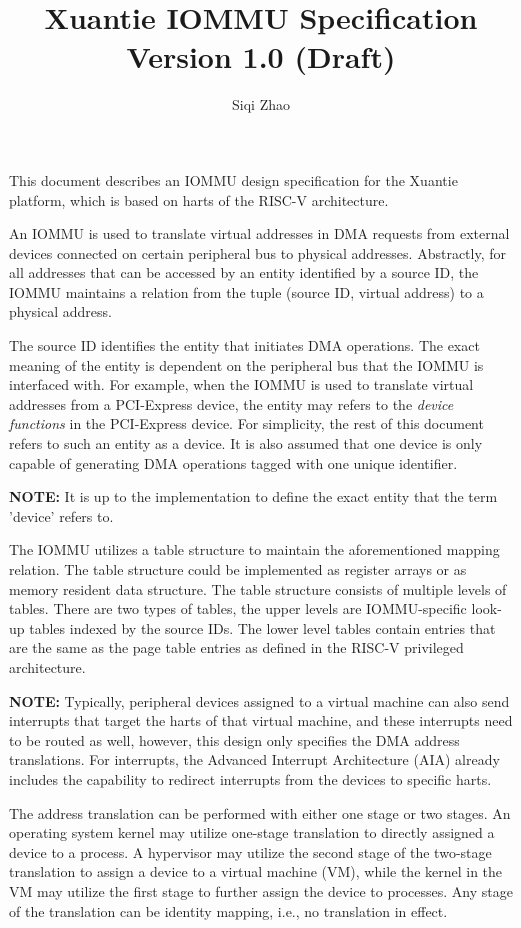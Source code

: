 \documentclass[12pt]{article}
\newcommand{\note}{\vspace{1em}\textbf{NOTE: }}
\newcommand{\noteend}{\vspace{1em}}
\begin{document}
\title{Xuantie IOMMU Specification Version 1.0 (Draft)}
\author{Siqi Zhao}
\maketitle


This document describes an IOMMU design specification for the Xuantie platform, which is
based on harts of the RISC-V architecture.

An IOMMU is used to translate virtual addresses in DMA requests from external devices
connected on certain peripheral bus to physical addresses. Abstractly, for all addresses
that can be accessed by an entity identified by a source ID, the IOMMU maintains a relation
from the tuple (source ID, virtual address) to a physical address.

The source ID identifies the entity that initiates DMA operations. The exact meaning of
the entity is dependent on the peripheral bus that the IOMMU is
interfaced with. For example, when the IOMMU is used to translate virtual addresses from
a PCI-Express device, the entity may refers to the \textit{device functions} in the
PCI-Express device. For simplicity, the rest of this document refers to such an entity as
a device. It is also assumed that one device is only capable of generating DMA operations
tagged with one unique identifier.

\note It is up to the implementation to define the exact entity that the term 'device'
refers to. \noteend

The IOMMU utilizes a table structure to maintain the aforementioned
mapping relation. The table structure could be implemented as register arrays or as memory
resident data structure. The table structure consists of multiple levels of tables. There are two
types of tables, the upper levels are IOMMU-specific look-up tables indexed by the source
IDs. The lower level tables contain entries that are the same as the page table entries as
defined in the RISC-V privileged architecture.

\note Typically, peripheral devices assigned to a virtual machine can also send interrupts
that target the harts of that virtual machine, and these interrupts need to be routed as
well, however, this design only specifies the DMA address translations. For interrupts,
the Advanced Interrupt Architecture (AIA) already includes the capability to redirect
interrupts from the devices to specific harts.\noteend

The address translation can be performed with either one stage or two stages. An operating
system kernel may utilize one-stage translation to directly assigned a device to a
process. A hypervisor may utilize the second stage of the two-stage translation to assign
a device to a virtual machine (VM), while the kernel in the VM may utilize the first stage
to further assign the device to processes. Any stage of the translation can be identity
mapping, i.e., no translation in effect.
\end{document}
